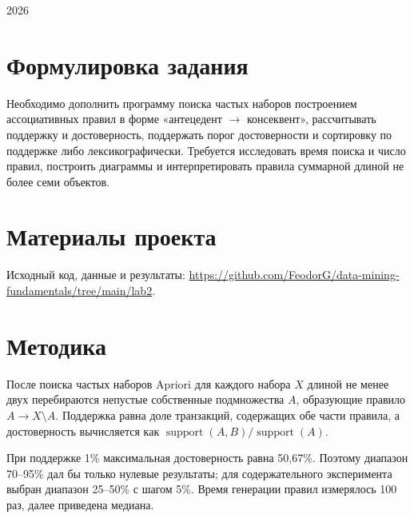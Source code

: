 \documentclass[12pt,a4paper]{article}
\begin{document}
\begin{titlepage}\centering
\vspace*{3cm}{\Huge\bfseries ОТЧЁТ О ВЫПОЛНЕНИИ ЗАДАНИЯ\par}
\vspace{1cm}{\LARGE\bfseries Поиск ассоциативных правил\\на основе алгоритма Apriori\par}
\vspace{3cm}\vfill 2026
\end{titlepage}

\section{Формулировка задания}
Необходимо дополнить программу поиска частых наборов построением ассоциативных правил в форме «антецедент $\to$ консеквент», рассчитывать поддержку и достоверность, поддержать порог достоверности и сортировку по поддержке либо лексикографически. Требуется исследовать время поиска и число правил, построить диаграммы и интерпретировать правила суммарной длиной не более семи объектов.

\section{Материалы проекта}
Исходный код, данные и результаты: \url{https://github.com/FeodorG/data-mining-fundamentals/tree/main/lab2}.

\section{Методика}
После поиска частых наборов Apriori для каждого набора $X$ длиной не менее двух перебираются непустые собственные подмножества $A$, образующие правило $A\to X\setminus A$. Поддержка равна доле транзакций, содержащих обе части правила, а достоверность вычисляется как $\operatorname{support}(A,B)/\operatorname{support}(A)$.

При поддержке 1\% максимальная достоверность равна 50{,}67\%. Поэтому диапазон 70--95\% дал бы только нулевые результаты; для содержательного эксперимента выбран диапазон 25--50\% с шагом 5\%. Время генерации правил измерялось 100 раз, далее приведена медиана.
\end{document}

